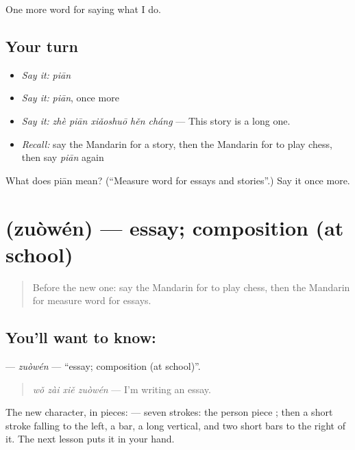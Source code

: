 \begin{grammarlens}[title={What you've built}]
One more word for saying what I do.
\end{grammarlens}

\subsection*{Your turn}
\begin{itemize}
\raggedright
  \item \emph{Say it:} \emph{piān}
  \item \emph{Say it:} \emph{piān}, once more
  \item \emph{Say it:} \emph{zhè piān xiǎoshuō hěn cháng} — This story is a long one.
  \item \emph{Recall:} say the Mandarin for a story, then the Mandarin for to play chess, then say \emph{piān} again
\end{itemize}

\begin{tcolorbox}[breakable,colback=teal!4,colframe=teal!35!black,title={Before you move on}]
What does piān mean? (\textquotedblleft{}Measure word for essays and stories\textquotedblright{}.) Say it once more.
\end{tcolorbox}
\section[\texorpdfstring{\zh{作文} (zuòwén)}{作文 (zuòwén)}]{ (zuòwén) — essay; composition (at school)}

\label{lesson:ZH-C251-zuowen}



\begin{quote}
Before the new one: say the Mandarin for to play chess, then the Mandarin for measure word for essays.
\end{quote}

\subsection*{You'll want to know: }
\textbf{} — \emph{zuòwén} — \textquotedblleft{}essay; composition (at school)\textquotedblright{}.

\begin{quote}
\emph{wǒ zài xiě zuòwén} — I'm writing an essay.
\end{quote}

The new character, in pieces:  — seven strokes: the person piece ; then a short stroke falling to the left, a bar, a long vertical, and two short bars to the right of it. The next lesson puts it in your hand.

